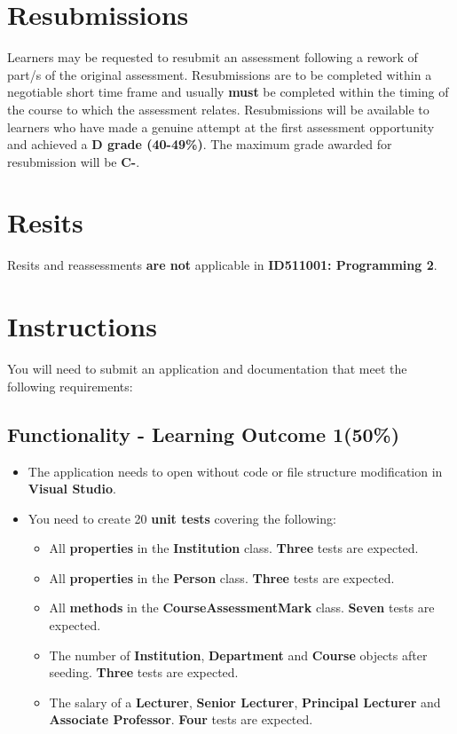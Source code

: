 \documentclass{article}
\begin{document}
\section*{Resubmissions}
Learners may be requested to resubmit an assessment following a rework of part/s of the original assessment. Resubmissions are to be completed within a negotiable short time frame and usually \textbf{must} be completed within the timing of the course to which the assessment relates. Resubmissions will be available to learners who have made a genuine attempt at the first assessment opportunity and achieved a \textbf{D grade (40-49\%)}. The maximum grade awarded for resubmission will be \textbf{C-}.

\section*{Resits}
Resits and reassessments \textbf{are not} applicable in \textbf{ID511001: Programming 2}.

\section*{Instructions}
You will need to submit an application and documentation that meet the following requirements:\\

\subsection*{Functionality - Learning Outcome 1(50\%)}
\begin{itemize}
    \item The application needs to open without code or file structure modification in \textbf{Visual Studio}.
    \item You need to create 20 \textbf{unit tests} covering the following:
    \begin{itemize}
        \item All \textbf{properties} in the \textbf{Institution} class. \textbf{Three} tests are expected.
        \item All \textbf{properties} in the \textbf{Person} class. \textbf{Three} tests are expected.
        \item All \textbf{methods} in the \textbf{CourseAssessmentMark} class. \textbf{Seven} tests are expected.
        \item The number of \textbf{Institution}, \textbf{Department} and \textbf{Course} objects after seeding. \textbf{Three} tests are expected.
        \item The salary of a \textbf{Lecturer}, \textbf{Senior Lecturer}, \textbf{Principal Lecturer} and \textbf{Associate Professor}. \textbf{Four} tests are expected.
    \end{itemize}
\end{itemize}
\end{document}
